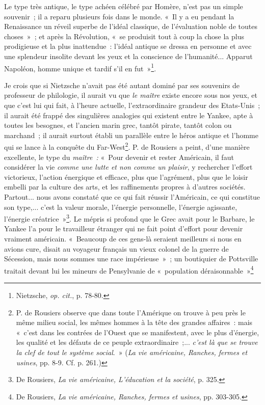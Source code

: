 \documentclass[french,twoside]{book} %
\begin{document}
Le type très antique, le type achéen célébré par Homère, n’est pas un simple souvenir ; il a reparu plusieurs fois dans le monde. « Il y a eu pendant la Renaissance un réveil superbe de l’idéal classique, de l’évaluation noble de toutes choses » ; et après la Révolution, « se produisit tout à coup la chose la plus prodigieuse et la plus inattendue : l’idéal antique se dressa en personne et avec une splendeur insolite devant les yeux et la conscience de l’humanité... Apparut Napoléon, homme unique et tardif s’il en fut »\footnote{ \noindent Nietzsche, \emph{op. cit.}, p. 78-80.
 }.\par
Je crois que si Nietzsche n’avait pas été autant dominé par ses souvenirs de professeur de philologie, il aurait vu que \emph{le maître} existe encore sous nos yeux, et que c’est lui qui fait, à l’heure actuelle, l’extraordinaire grandeur des Etats-Unis ; il aurait été frappé des singulières analogies qui existent entre le Yankee, apte à toutes les besognes, et l’ancien marin grec, tantôt pirate, tantôt colon ou marchand ; il aurait surtout établi un parallèle entre le héros antique et l’homme qui se lance à la conquête du Far-West\footnote{ \noindent P. de Rousiers observe que dans toute l’Amérique on trouve à peu près le même milieu social, les mêmes hommes à la tête des grandes affaires : mais « c’est dans les contrées de l’Ouest que se manifestent, avec le plus d’énergie, les qualité et les défauts de ce peuple extraordinaire ;... \emph{c’est là que se trouve la clef de tout le système social}. » (\emph{La vie américaine, Ranches, fermes et usines}, pp. 8-9. Cf. p. 261.)
 }. P. de Rousiers a peint, d’une manière excellente, le type du \emph{maître :} « Pour devenir et rester  Américain, il faut considérer la vie \emph{comme une lutte et non comme un plaisir}, y rechercher l’effort victorieux, l’action énergique et efficace, plus que l’agrément, plus que le loisir embelli par la culture des arts, et les raffinements propres à d’autres sociétés. Partout... nous avons constaté que ce qui fait réussir l’Américain, ce qui constitue son type,... c’est la valeur morale, l’énergie personnelle, l’énergie agissante, l’énergie créatrice »\footnote{ \noindent De Rousiers, \emph{La vie américaine, L’éducation et la société}, p. 325.
 }. Le mépris si profond que le Grec avait pour le Barbare, le Yankee l’a pour le travailleur étranger qui ne fait point d’effort pour devenir vraiment américain. « Beaucoup de ces gens-là seraient meilleurs si nous en avions cure, disait au voyageur français un vieux colonel de la guerre de Sécession, mais nous sommes une race impérieuse » ; un boutiquier de Pottsville traitait devant lui les mineurs de Pensylvanie de « population déraisonnable »\footnote{ \noindent De Rousiers, \emph{La vie américaine, Ranches, fermes et usines}, pp. 303-305.
}
\end{document}
